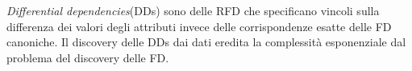 \textit{Differential dependencies}(DDs) sono delle RFD che specificano vincoli sulla differenza dei valori degli attributi invece delle corrispondenze esatte delle FD canoniche. Il discovery delle DDs dai dati eredita la complessità esponenziale dal problema del discovery delle FD.